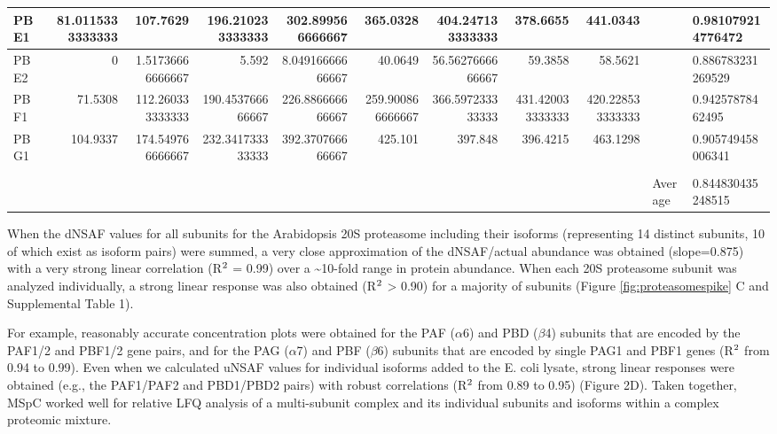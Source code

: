 \begin{table}
{\begin{tabular}{ | l | n{2}{5} | n{2}{5} | n{2}{5} | n{2}{5} | n{2}{5} | n{2}{5} | n{2}{5} | n{2}{5} | l | l | }
	PBE1 & 81.0115333333333 & 107.7629 & 196.210233333333 & 302.899566666667 & 365.0328 & 404.247133333333 & 378.6655 & 441.0343 &  & 0.981079214776472 \\ \hline
	PBE2 & 0 & 1.51736666666667 & 5.592 & 8.04916666666667 & 40.0649 & 56.5627666666667 & 59.3858 & 58.5621 &  & 0.886783231269529 \\ \hline
	PBF1 & 71.5308 & 112.260333333333 & 190.453766666667 & 226.886666666667 & 259.900866666667 & 366.597233333333 & 431.420033333333 & 420.228533333333 &  & 0.94257878462495 \\ \hline
	PBG1 & 104.9337 & 174.549766666667 & 232.341733333333 & 392.370766666667 & 425.101 & 397.848 & 396.4215 & 463.1298 &  & 0.905749458006341 \\ \hline
	 &  &  &  &  &  &  &  &  &  &  \\ \hline
	 &  &  &  &  &  &  &  &  & Average & 0.844830435248515 \\ \hline
\end{tabular}}
\npnoround
\label{table:abacus}
\end{table}
When the dNSAF values for all subunits for the Arabidopsis 20S proteasome including their isoforms (representing 14 distinct subunits, 10 of which exist as isoform pairs) were summed, a very close approximation of the dNSAF/actual abundance was obtained (slope=0.875) with a very strong linear correlation (R$\textsuperscript{2}$ = 0.99) over a \textasciitilde10-fold range in protein abundance.  
When each 20S proteasome subunit was analyzed individually, a strong linear response was also obtained (R$\textsuperscript{2}$ > 0.90) for a majority of subunits (Figure \ref{fig:proteasomespike} C and Supplemental Table 1).

For example, reasonably accurate concentration plots were obtained for the PAF ($\alpha$6) and PBD ($\beta$4) subunits that are encoded by the PAF1/2 and PBF1/2 gene pairs, and for the PAG ($\alpha$7) and PBF ($\beta$6) subunits that are encoded by single PAG1 and PBF1 genes (R$\textsuperscript{2}$  from 0.94 to 0.99).
Even when we calculated uNSAF values for individual isoforms added to the E. coli lysate, strong linear responses were obtained (e.g., the PAF1/PAF2 and PBD1/PBD2 pairs) with robust correlations (R$\textsuperscript{2}$ from 0.89 to 0.95) (Figure 2D).
Taken together, MSpC worked well for relative LFQ analysis of a multi-subunit complex and its individual subunits and isoforms within a complex proteomic mixture.

